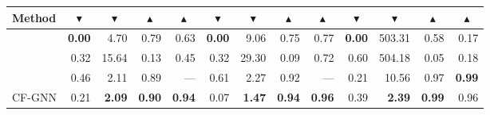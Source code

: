 \begin{table*}[h]
{\begin{tabular}{lrrrr rrrr rrrr}
Method & \multicolumn{1}{c}{$\blacktriangledown$} &\multicolumn{1}{c}{$\blacktriangledown$} &\multicolumn{1}{c}{$\blacktriangle$} & \multicolumn{1}{c}{$\blacktriangle$} & \multicolumn{1}{c}{$\blacktriangledown$} &\multicolumn{1}{c}{$\blacktriangledown$} &\multicolumn{1}{c}{$\blacktriangle$} & \multicolumn{1}{c}{$\blacktriangle$} & \multicolumn{1}{c}{$\blacktriangledown$} &\multicolumn{1}{c}{$\blacktriangledown$} &\multicolumn{1}{c}{$\blacktriangle$} & \multicolumn{1}{c}{$\blacktriangle$} \\
\midrule
\baserand{}               & \textbf{0.00}                     & 4.70                              & 0.79                                & 0.63                               & \textbf{0.00}                     & 9.06                              & 0.75                                & 0.77                               & \textbf{0.00}                     & 503.31                            & 0.58                                & 0.17                              \\
\basekeep{}                 & 0.32                              & 15.64                             & 0.13                                & 0.45                               & 0.32                              & 29.30                             & 0.09                                & 0.72                               & 0.60                              & 504.18                            & 0.05                                & 0.18                              \\
\baserm{}              & 0.46                              & 2.11                              & 0.89                                & ---                                  & 0.61                              & 2.27                              & 0.92                                & ---                                  & 0.21                              & 10.56                             & 0.97                                & \textbf{0.99}                     \\



\midrule
CF-GNN              & 0.21                              & \textbf{2.09}                     & \textbf{0.90}                       & \textbf{0.94}                      & 0.07                              & \textbf{1.47}                     & \textbf{0.94}                       & \textbf{0.96}                      & 0.39                              & \textbf{2.39}                     & \textbf{0.99}                       & 0.96                 \\
\bottomrule
\end{tabular}
}
\end{table*}

